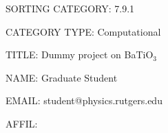 \pagestyle{empty}
\parindent=0pt
\parskip=5pt



% 
% 
% 
%
%



SORTING CATEGORY: 7.9.1

CATEGORY TYPE: Computational

TITLE: Dummy project on BaTiO$_3$



NAME: Graduate Student

EMAIL: student@physics.rutgers.edu

AFFIL:



